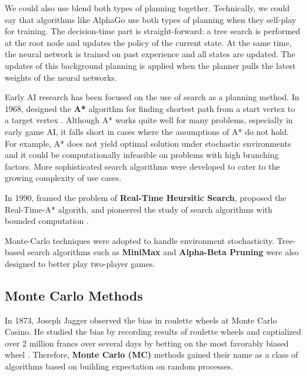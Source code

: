 \documentclass[12pt]{article}
\newcommand{\note}[1]{\todo[color=yellow!40,bordercolor=none,linecolor=black]{#1}}
\begin{document}
We could also use blend both types of planning together.
Technically, we could say that algorithms like AlphaGo use both types of planning when they self-play for training.
The decision-time part is straight-forward: a tree search is performed at the root node and updates the policy of the current state.
At the same time, the neural network is trained on past experience and all states are updated.
The updates of this background planning is applied when the planner pulls the latest weights of the neural networks.


Early AI research has been focused on the use of search as a planning method.
In 1968, \citeauthor{FormalBasisHeuristic_Hart.Nilsson.ea_1968} designed the \textbf{A*} algorithm for finding shortest path from a start vertex to a target vertex \cite{FormalBasisHeuristic_Hart.Nilsson.ea_1968}.
Although A* works quite well for many problems, especially in early game AI, it falls short in cases where the assumptions of A* do not hold.
For example, A* does not yield optimal solution under stochastic environments and it could be computationally infeasible on problems with high branching factors.
More sophisticated search algorithms were developed to cater to the growing complexity of use cases.

In 1990, \citeauthor{RealtimeHeuristicSearch_Korf_1990} framed the problem of \textbf{Real-Time Heursitic Search},
proposed the Real-Time-A* algorith, and pioneered the study of search algorithms with bounded computation \cite{RealtimeHeuristicSearch_Korf_1990}.

Monte-Carlo techniques were adopted to handle environment stochasticity.
Tree-based search algorithms such as \textbf{MiniMax} and \textbf{Alpha-Beta Pruning} were also designed to better play two-player games.

\subsection{Monte Carlo Methods}
In 1873, Joseph Jagger observed the bias in roulette wheels at Monte Carlo Casino.
He studied the bias by recording results of roulette wheels and captialized over 2 million francs over several days by betting on the most favorably biased wheel \cite{MonteCarloCasino__2022}.
Therefore, \textbf{Monte Carlo (MC)} methods gained their name as a class of algorithms based on building expectation on random processes.
\end{document}
